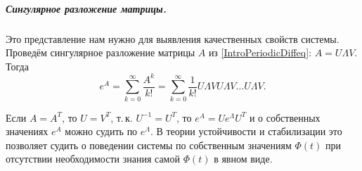 \subparagraph{Сингулярное разложение матрицы.}	%
Это представление нам нужно для выявления качественных свойств системы.
Проведём сингулярное разложение матрицы $A$ из \eqref{IntroPeriodicDiffeq}:
$A=U\Lambda V$. Тогда
$$
  e^A = \sum_{k=0}^\infty {\dfrac{A^k}{k!}} =
  \sum_{k=0}^\infty {\dfrac{1}{k!} U\Lambda V U\Lambda V \dots U\Lambda V}.
$$

Если $A=A^T$, то $U = V^T$, т.\,к. $U^{-1} = U^T$,
то $e^A = Ue^{\Lambda} U^T$ и о собственных
значениях $e^A$ можно судить по $e^\Lambda$.
В теории устойчивости и стабилизации это позволяет
судить о поведении системы по собственным
значениям $\Phi(t)$ при отсутствии необходимости
знания самой $\Phi(t)$ в явном виде.